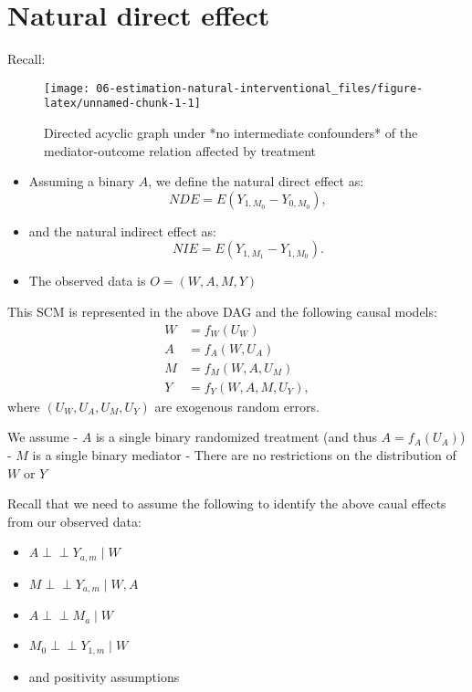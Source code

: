\documentclass[
  12pt,
]{book}
\providecommand{\tightlist}{%
  \setlength{\itemsep}{0pt}\setlength{\parskip}{0pt}}
\theoremstyle{definition}
\theoremstyle{definition}
\theoremstyle{definition}
\newcommand{\indep}{\mbox{$\perp\!\!\!\perp$}}
\newcommand{\1}{\mathbbm{1}}
\begin{document}
\hypertarget{natural-direct-effect}{%
\section{Natural direct effect}\label{natural-direct-effect}}

Recall:

\begin{figure}

{\centering \texttt{[image: 06-estimation-natural-interventional\_files/figure-latex/unnamed-chunk-1-1]} 

}

\caption{Directed acyclic graph under *no intermediate confounders* of the mediator-outcome relation affected by treatment}\label{fig:unnamed-chunk-1}
\end{figure}

\begin{itemize}
\item
  Assuming a binary \(A\), we define the natural direct effect as: \[NDE = E(Y_{1,M_{0}} - Y_{0,M_{0}}),\]
\item
  and the natural indirect effect as: \[NIE = E(Y_{1,M_{1}} - Y_{1,M_{0}}).\]
\item
  The observed data is \(O=(W, A, M, Y)\)
\end{itemize}

This SCM is represented in the above DAG and the following causal models:
\begin{align*}
  W & = f_W(U_W)\\
  A & = f_A(W, U_A)\\
  M & = f_M(W, A, U_M)\\
  Y & = f_Y(W, A, M, U_Y),
\end{align*}
where \((U_W, U_A,U_M, U_Y)\) are exogenous random errors.

We assume
- \(A\) is a single binary randomized treatment (and thus \(A = f_A(U_A)\))
- \(M\) is a single binary mediator
- There are no restrictions on the distribution of \(W\) or \(Y\)

Recall that we need to assume the following to identify the above caual effects
from our observed data:

\begin{itemize}
\tightlist
\item
  \(A \indep Y_{a,m} \mid W\)
\item
  \(M \indep Y_{a,m} \mid W, A\)
\item
  \(A \indep M_a \mid W\)
\item
  \(M_0 \indep Y_{1,m} \mid W\)
\item
  and positivity assumptions
\end{itemize}
\end{document}
